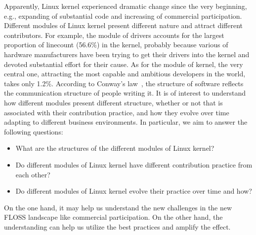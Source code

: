 \documentclass{sig-alternate-05-2015}
\begin{document}
Apparently, Linux kernel experienced dramatic change since the very
beginning, e.g., expanding of substantial code and increasing of commercial participation.
Different modules of Linux kernel present different nature
and attract different contributors. For example, the module of drivers
accounts for the largest proportion of linecount (56.6\%) in the kernel, 
probably because various of 
hardware manufacturers have been trying to get their drivers into the kernel
and devoted substantial effort for their cause.
 As for the module of kernel, the very central one, attracting the most
capable and ambitious developers in the world, takes only 1.2\%.
According to Conway's law~\cite{conway}, the structure of software reflects 
the communication structure of people writing it.
It is of interest to understand how different modules present different
structure, whether or not that is associated with their contribution practice,
and how they evolve over time adapting to different business environments. 
In particular, we aim to answer the following questions:
\begin{itemize}
\item What are the structures of the different modules of Linux kernel?
\item Do different modules of Linux kernel have different contribution practice from each other?
\item Do different modules of Linux kernel evolve their practice over time and how?
\end{itemize}
On the one hand,
it may help us understand the new challenges in the new FLOSS landscape like
commercial participation.
On the other hand, the understanding can help us
utilize the best practices and amplify the effect. 

\end{document}
